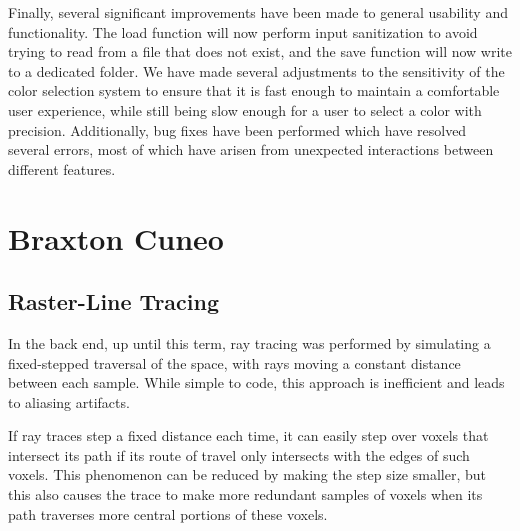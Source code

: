 \documentclass[onecolumn, draftclsnofoot,10pt, compsoc]{IEEEtran}
\begin{document}
Finally, several significant improvements have been made to general usability and functionality. The load function will now perform input sanitization to avoid trying to read from a file that does not exist, and the save function will now write to a dedicated folder. We have made several adjustments to the sensitivity of the color selection system to ensure that it is fast enough to maintain a comfortable user experience, while still being slow enough for a user to select a color with precision. Additionally, bug fixes have been performed which have resolved several errors, most of which have arisen from unexpected interactions between different features.



\section{Braxton Cuneo}


\subsection{Raster-Line Tracing}

In the back end, up until this term, ray tracing was performed by simulating a fixed-stepped traversal of the space, with rays moving a constant distance between each sample. While simple to code, this approach is inefficient and leads to aliasing artifacts.

If ray traces step a fixed distance each time, it can easily step over voxels that intersect its path if its route of travel only intersects with the edges of such voxels. This phenomenon can be reduced by making the step size smaller, but this also causes the trace to make more redundant samples of voxels when its path traverses more central portions of these voxels.
\end{document}
